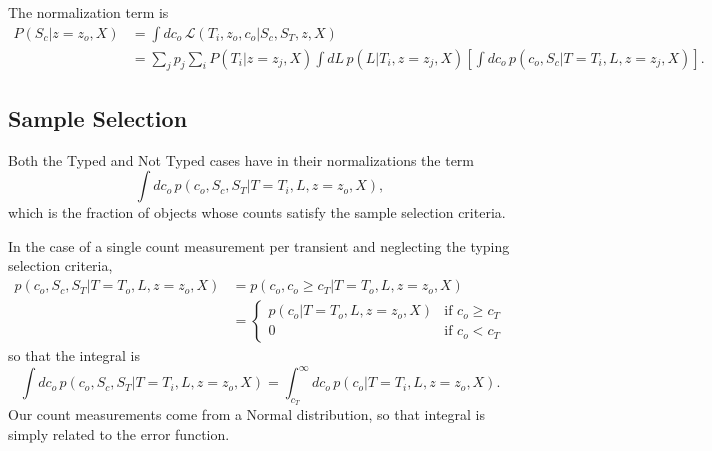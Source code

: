 \documentclass[preprint,3p]{elsarticle}
\begin{document}
The normalization term is
\begin{align}
P(S_c| z=z_o, X) & = \int dc_o \, \mathcal{L}(T_i,z_o,c_o | S_c, S_T, z, X)\\
& =  \sum_j p_j  \sum_{i} P(T_i|z=z_j, X)  \int dL \, p(L|T_i, z=z_j, X) 
\left[ \int dc_o \, p(c_o, S_c| T=T_i, L, z=z_j, X) \right].
\end{align}

\subsection{Sample Selection}
Both the Typed and Not Typed cases have in their normalizations the term
\begin{equation}
\int dc_o \, p(c_o,S_c, S_T | T=T_i, L, z=z_o, X),
\end{equation}
which is the fraction of objects whose counts satisfy the sample selection criteria.


In the case of a single count measurement per transient and neglecting the typing selection criteria,
\begin{align}
 p(c_o, S_c, S_T | T=T_o, L, z=z_o, X) &=  p(c_o, c_o \ge  c_T | T=T_o, L, z=z_o, X) \\
 &= \begin{cases}
   p(c_o | T=T_o, L, z=z_o, X) & \text{if } c_o \ge c_T \\
   0 & \text{if }  c_o < c_T
 \end{cases}
\end{align}
so that the integral is
\begin{equation}
\int dc_o \, p(c_o,S_c, S_T | T=T_i, L, z=z_o, X) = \int_{c_T}^\infty dc_o\,  p(c_o | T=T_i, L, z=z_o, X).
\end{equation}
Our count measurements come from a Normal distribution, so that integral is simply related to the error function.
\end{document}
